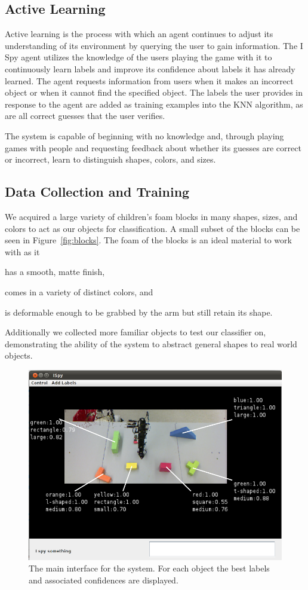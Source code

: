 \documentclass[11pt]{article}
\begin{document}
\subsection{Active Learning}
Active learning is the process with which an agent continues to adjust its
understanding of its environment by querying the user to gain information.
The I Spy agent utilizes the knowledge of the users playing the game with it
to continuously learn labels and improve its confidence about labels it has
already learned. The agent requests information from users when it makes an
incorrect object or when it cannot find the specified object. The labels the
user provides in response to the agent are added as training examples into the
KNN algorithm, as are all correct guesses that the user verifies.

The system is capable of beginning with no knowledge and, through playing games
with people and requesting feedback about whether its guesses are correct or
incorrect, learn to distinguish shapes, colors, and sizes.


\subsection{Data Collection and Training}
We acquired a large variety of children's foam blocks in many shapes, sizes,
and colors to act as our objects for classification. A small subset of the
blocks can be seen in Figure~\ref{fig:blocks}. The foam of the blocks is an
ideal material to work with as it
\begin{inparaenum}[(1)]
\item has a smooth, matte finish,
\item comes in a variety of distinct colors, and
\item is deformable enough to be grabbed by the arm but still retain its
shape.
\end{inparaenum}
Additionally we collected
more familiar objects to test our classifier on, demonstrating the ability of
the system to abstract general shapes to real world objects.

\begin{figure}[h!]
\centering
    \includegraphics[width=.75\textwidth]{figures/screenshot.png}
    \caption{The main interface for the system. For each object the best labels and associated confidences are displayed.}
    \label{fig:screenshot}
\end{figure}
\end{document}

